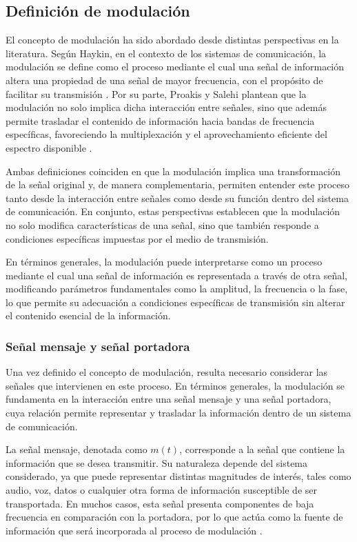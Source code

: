 \subsection{Definición de modulación}

El concepto de modulación ha sido abordado desde distintas perspectivas en la literatura. Según Haykin, en el contexto de los sistemas de comunicación, la modulación se define como el proceso mediante el cual una señal de información altera una propiedad de una señal de mayor frecuencia, con el propósito de facilitar su transmisión \cite{haykin2001}. Por su parte, Proakis y Salehi plantean que la modulación no solo implica dicha interacción entre señales, sino que además permite trasladar el contenido de información hacia bandas de frecuencia específicas, favoreciendo la multiplexación y el aprovechamiento eficiente del espectro disponible \cite{proakis2007digital}.

Ambas definiciones coinciden en que la modulación implica una transformación de la señal original y, de manera complementaria, permiten entender este proceso tanto desde la interacción entre señales como desde su función dentro del sistema de comunicación. En conjunto, estas perspectivas establecen que la modulación no solo modifica características de una señal, sino que también responde a condiciones específicas impuestas por el medio de transmisión.

En términos generales, la modulación puede interpretarse como un proceso mediante el cual una señal de información es representada a través de otra señal, modificando parámetros fundamentales como la amplitud, la frecuencia o la fase, lo que permite su adecuación a condiciones específicas de transmisión sin alterar el contenido esencial de la información.

\subsubsection{Señal mensaje y señal portadora}

Una vez definido el concepto de modulación, resulta necesario considerar las señales que intervienen en este proceso. En términos generales, la modulación se fundamenta en la interacción entre una señal mensaje y una señal portadora, cuya relación permite representar y trasladar la información dentro de un sistema de comunicación.

La señal mensaje, denotada como $m(t)$, corresponde a la señal que contiene la información que se desea transmitir. Su naturaleza depende del sistema considerado, ya que puede representar distintas magnitudes de interés, tales como audio, voz, datos o cualquier otra forma de información susceptible de ser transportada. En muchos casos, esta señal presenta componentes de baja frecuencia en comparación con la portadora, por lo que actúa como la fuente de información que será incorporada al proceso de modulación \cite{lathi2009modern}.

